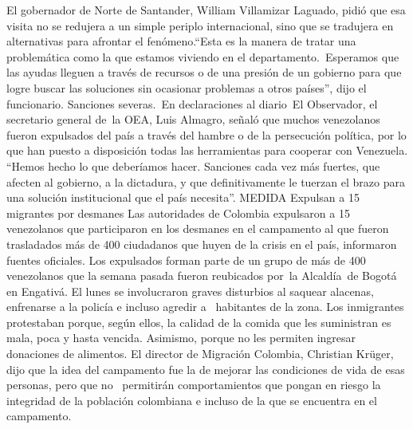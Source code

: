 \documentclass{article}%
\begin{document}
\newline%
%
El gobernador de Norte de Santander, William Villamizar Laguado, pidió que esa visita no se redujera a un simple periplo internacional, sino que se tradujera en alternativas para afrontar el fenómeno.“Esta es la manera de tratar una problemática como la que estamos viviendo en el departamento.~Esperamos que las ayudas lleguen a través de recursos o de una presión de un gobierno para que logre buscar las soluciones sin ocasionar problemas a otros países”, dijo el funcionario.%
\newline%
%
Sanciones severas.~En declaraciones al diario~El Observador, el secretario general de~la OEA, Luis Almagro, señaló que muchos venezolanos fueron expulsados del país a través del hambre o de la persecución política, por lo que han puesto a disposición todas las herramientas para cooperar con Venezuela. “Hemos hecho lo que deberíamos hacer. Sanciones cada vez más fuertes, que afecten al gobierno, a la dictadura, y que definitivamente le tuerzan el brazo para una solución institucional que el país necesita”.%
\newline%
%
MEDIDA%
\newline%
%
Expulsan a 15 migrantes por desmanes%
\newline%
%
Las autoridades de Colombia expulsaron a 15 venezolanos que participaron en los desmanes en el campamento al que fueron trasladados más de 400 ciudadanos que huyen de la crisis en el país, informaron fuentes oficiales.%
\newline%
%
Los expulsados forman parte de un grupo de más de 400 venezolanos que la semana pasada fueron reubicados por~la Alcaldía~de Bogotá en Engativá. El lunes se involucraron graves disturbios al saquear alacenas, enfrenarse a la policía e incluso agredir a ~habitantes de la zona.%
\newline%
%
Los inmigrantes protestaban porque, según ellos, la calidad de la comida que les suministran es mala, poca y hasta vencida. Asimismo, porque no les permiten ingresar donaciones de alimentos.%
\newline%
%
El director de Migración Colombia, Christian Krüger, dijo que la idea del campamento fue la de mejorar las condiciones de vida de esas personas, pero que no ~permitirán comportamientos que pongan en riesgo la integridad de la población colombiana e incluso de la que se encuentra en el campamento.%
\newline%
%
\end{document}
